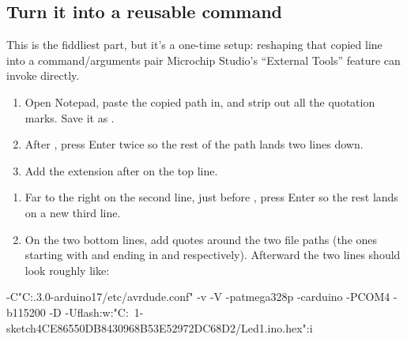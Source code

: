 \subsection{Turn it into a reusable command}
\label{c2:c:6}
This is the fiddliest part, but it's a one-time setup: reshaping that copied line into a
command/arguments pair Microchip Studio's ``External Tools'' feature can invoke directly.
\begin{enumerate}
  \item Open Notepad, paste the copied path in, and strip out all the quotation marks. Save it as
    .
  \item After , press Enter twice so the rest of the path lands two lines down.
  \item Add the extension  after  on the top line.
\end{enumerate}



\begin{enumerate}[resume]
  \item Far to the right on the second line, just before , press Enter so the rest
    lands on a new third line.
  \item On the two bottom lines, add quotes around the two file paths (the ones starting with
     and ending in  and  respectively). Afterward the two lines
    should look roughly like:
\end{enumerate}

\begin{console}
-C"C:\Users{}\AppData\Local{}\packages\arduino\tools\avrdude\6.3.0-arduino17/etc/avrdude.conf" -v -V -patmega328p -carduino -PCOM4 -b115200 -D
-Uflash:w:"C:\Users\ERIPIH~1\AppData\Local\Temp\arduino-sketch4CE86550DB8430968B53E52972DC68D2/Led1.ino.hex":i
\end{console}


